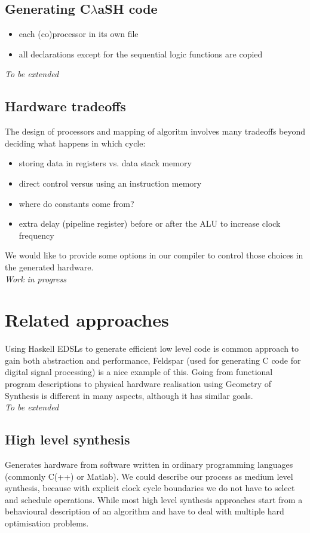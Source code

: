 \documentclass[preprint]{sigplanconf}
\def\clash{C$\lambda$aSH\xspace}
\begin{document}
\subsection{Generating \clash code}
\begin{itemize}
  \item each (co)processor in its own file
  \item all declarations except for the sequential logic functions are copied
\end{itemize}

\textit{To be extended}


\subsection{Hardware tradeoffs}
The design of processors and mapping of algoritm involves many tradeoffs beyond deciding what happens in which cycle:
\begin{itemize}
  \item storing data in registers vs. data stack memory
  \item direct control versus using an instruction memory
  \item where do constants come from?
  \item extra delay (pipeline register) before or after the ALU to increase clock frequency
\end{itemize}
We would like to provide some options in our compiler to control those choices in the generated hardware. \\

\textit{Work in progress}


\section{Related approaches}

Using Haskell EDSLs to generate efficient low level code is common approach to gain both abstraction and performance, Feldspar \cite{Feldspar} (used for generating C code for digital signal processing) is a nice example of this.
Going from functional program descriptions to physical hardware realisation using Geometry of Synthesis \cite{Ghica} is different in many aspects, although it has similar goals. \\

\textit{To be extended}

\subsection{High level synthesis}
Generates hardware from software written in ordinary programming languages (commonly C(++) or Matlab).
We could describe our process as medium level synthesis, because with explicit clock cycle boundaries we do not have to select and schedule operations.
While most high level synthesis approaches start from a behavioural description of an algorithm and have to deal with multiple hard optimisation problems. \\
\end{document}
